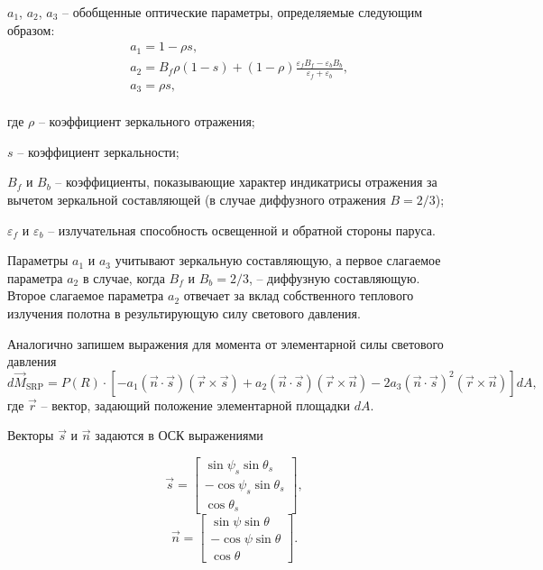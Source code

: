 $a_{1}$, $a_{2}$, $a_{3}$ -- обобщенные оптические параметры, определяемые
следующим образом:
\begin{equation}
  \begin{aligned}
    & a_{1} = 1 - \rho s, \\
    & a_{2} = B_f\rho(1 - s) + (1 - \rho)\frac{\varepsilon_f B_f - \varepsilon_b B_b}{\varepsilon_f + \varepsilon_b}, \\
    & a_{3} = \rho s, \\
  \end{aligned}
\end{equation}\par
    где $\rho$ -- коэффициент зеркального отражения;\par
    $s$ -- коэффициент зеркальности;\par
    $B_f$ и $B_b$ -- коэффициенты, показывающие характер индикатрисы отражения за вычетом
зеркальной составляющей (в случае диффузного отражения $B = 2/3$);\par
    $\varepsilon_f$ и $\varepsilon_b$ -- излучательная способность освещенной и обратной стороны паруса.\par
  Параметры $a_{1}$ и $a_{3}$ учитывают зеркальную составляющую, а первое слагаемое
параметра $a_{2}$ в случае, когда $B_f$ и $B_b = 2/3$, -- диффузную составляющую.
Второе слагаемое параметра $a_{2}$ отвечает за вклад собственного теплового излучения
полотна в результирующую силу светового давления.\par
  Аналогично запишем выражения для момента от элементарной силы светового давления
\begin{equation}
  d\vec{M}_{\text{SRP}} = P(R) \cdot \left[
    -a_{1}(\vec{n}\cdot\vec{s})(\vec{r} \times \vec{s})
    +a_{2}(\vec{n}\cdot\vec{s})(\vec{r} \times \vec{n})
    -2a_{3}(\vec{n}\cdot\vec{s})^2(\vec{r} \times \vec{n})
  \right]dA,
\end{equation}
где $\vec{r}$ -- вектор, задающий положение элементарной площадки $dA$.\par
  Векторы $\vec{s}$ и $\vec{n}$ задаются в ОСК выражениями\par
\begin{equation} \label{eq:SunVector}
  \vec{s} = \begin{bmatrix}
     \sin\psi_s\sin\theta_s \\
    -\cos\psi_s\sin\theta_s \\
     \cos\theta_s
  \end{bmatrix},
\end{equation}
\begin{equation}
  \vec{n} = \begin{bmatrix}
     \sin\psi\sin\theta \\
    -\cos\psi\sin\theta \\
     \cos\theta
  \end{bmatrix}.
\end{equation}\par
